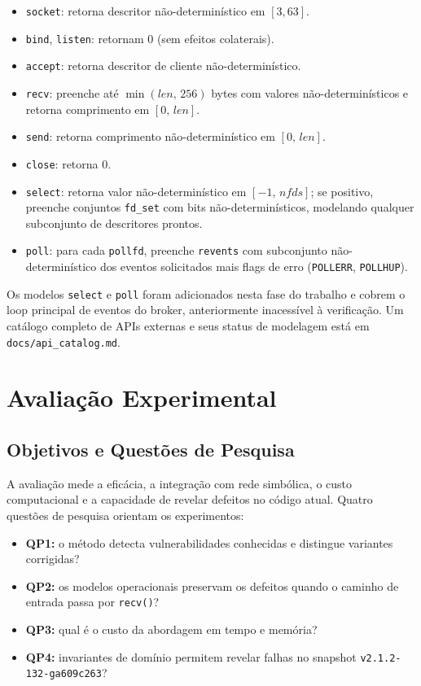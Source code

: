 \documentclass[conference]{IEEEtran}
\newcommand{\mosqsnapshot}{\texttt{v2.1.2-132-ga609c263}}
\begin{document}
\begin{itemize}
    \item \texttt{socket}: retorna descritor n\~ao-determin\'istico em $[3, 63]$.
    \item \texttt{bind}, \texttt{listen}: retornam 0 (sem efeitos colaterais).
    \item \texttt{accept}: retorna descritor de cliente n\~ao-determin\'istico.
    \item \texttt{recv}: preenche at\'e $\min(\textit{len},\,256)$ bytes com
          valores n\~ao-determin\'isticos e retorna comprimento em
          $[0,\,\textit{len}]$.
    \item \texttt{send}: retorna comprimento n\~ao-determin\'istico em
          $[0,\,\textit{len}]$.
    \item \texttt{close}: retorna 0.
    \item \texttt{select}: retorna valor n\~ao-determin\'istico em
          $[-1,\,\textit{nfds}]$; se positivo, preenche conjuntos \texttt{fd\_set}
          com bits n\~ao-determin\'isticos, modelando qualquer subconjunto de
          descritores prontos.
    \item \texttt{poll}: para cada \texttt{pollfd}, preenche \texttt{revents}
          com subconjunto n\~ao-determin\'istico dos eventos solicitados mais flags
          de erro (\texttt{POLLERR}, \texttt{POLLHUP}).
\end{itemize}

Os modelos \texttt{select} e \texttt{poll} foram adicionados nesta fase do
trabalho e cobrem o loop principal de eventos do broker, anteriormente
inacess\'ivel \`a verifica\c{c}\~ao. Um cat\'alogo completo de APIs externas e seus
status de modelagem est\'a em \texttt{docs/api\_catalog.md}.

\section{Avalia\c{c}\~ao Experimental}
\label{sec:resultados}

\subsection{Objetivos e Quest\~oes de Pesquisa}
A avalia\c{c}\~ao mede a efic\'acia, a integra\c{c}\~ao com rede simb\'olica, o custo
computacional e a capacidade de revelar defeitos no c\'odigo atual. Quatro
quest\~oes de pesquisa orientam os experimentos:

\begin{itemize}
    \item \textbf{QP1:} o m\'etodo detecta vulnerabilidades conhecidas e
          distingue variantes corrigidas?
    \item \textbf{QP2:} os modelos operacionais preservam os defeitos quando o
          caminho de entrada passa por \texttt{recv()}?
    \item \textbf{QP3:} qual \'e o custo da abordagem em tempo e mem\'oria?
    \item \textbf{QP4:} invariantes de dom\'inio permitem revelar falhas no
          snapshot \mosqsnapshot?
\end{itemize}
\end{document}

